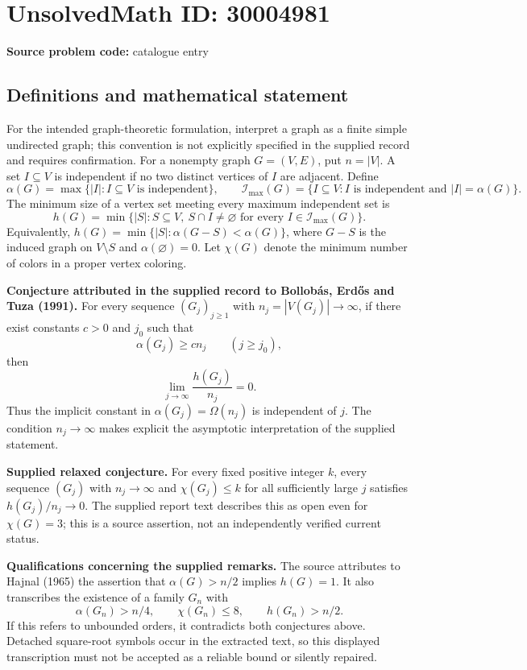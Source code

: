 \documentclass[11pt]{article}
\begin{document}
\section*{UnsolvedMath ID: 30004981}
\textbf{Source problem code:} catalogue entry
\subsection{Definitions and mathematical statement}
For the intended graph-theoretic formulation, interpret a graph as a finite simple undirected graph; this convention is not explicitly specified in the supplied record and requires confirmation. For a nonempty graph \(G=(V,E)\), put \(n=|V|\). A set \(I\subseteq V\) is independent if no two distinct vertices of \(I\) are adjacent. Define
\[
\alpha(G)=\max\{|I|:I\subseteq V\text{ is independent}\},
\qquad
\mathcal I_{\max}(G)=\{I\subseteq V:I\text{ is independent and }|I|=\alpha(G)\}.
\]
The minimum size of a vertex set meeting every maximum independent set is
\[
h(G)=\min\{|S|:S\subseteq V,\ S\cap I\ne\varnothing\text{ for every }I\in\mathcal I_{\max}(G)\}.
\]
Equivalently, \(h(G)=\min\{|S|:\alpha(G-S)<\alpha(G)\}\), where \(G-S\) is the induced graph on \(V\setminus S\) and \(\alpha(\varnothing)=0\). Let \(\chi(G)\) denote the minimum number of colors in a proper vertex coloring.

\textbf{Conjecture attributed in the supplied record to Bollob\'{a}s, Erd\H{o}s and Tuza (1991).} For every sequence \((G_j)_{j\ge1}\) with \(n_j=|V(G_j)|\to\infty\), if there exist constants \(c>0\) and \(j_0\) such that
\[
\alpha(G_j)\ge c n_j\qquad(j\ge j_0),
\]
then
\[
\lim_{j\to\infty}\frac{h(G_j)}{n_j}=0.
\]
Thus the implicit constant in \(\alpha(G_j)=\Omega(n_j)\) is independent of \(j\). The condition \(n_j\to\infty\) makes explicit the asymptotic interpretation of the supplied statement.

\textbf{Supplied relaxed conjecture.} For every fixed positive integer \(k\), every sequence \((G_j)\) with \(n_j\to\infty\) and \(\chi(G_j)\le k\) for all sufficiently large \(j\) satisfies \(h(G_j)/n_j\to0\). The supplied report text describes this as open even for \(\chi(G)=3\); this is a source assertion, not an independently verified current status.

\textbf{Qualifications concerning the supplied remarks.} The source attributes to Hajnal (1965) the assertion that \(\alpha(G)>n/2\) implies \(h(G)=1\). It also transcribes the existence of a family \(G_n\) with
\[
\alpha(G_n)>n/4,\qquad \chi(G_n)\le8,\qquad h(G_n)>n/2.
\]
If this refers to unbounded orders, it contradicts both conjectures above. Detached square-root symbols occur in the extracted text, so this displayed transcription must not be accepted as a reliable bound or silently repaired.
\end{document}
